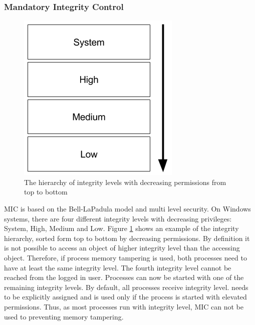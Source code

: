 \subsubsection{Mandatory Integrity Control}
\label{sec:mic}
\begin{figure}[!htbp]
\centering
\includegraphics[scale=0.5]{sections/background/defenses/mic.png}
\caption{The hierarchy of integrity levels with decreasing permissions from top to bottom}
\label{fig:mic}
\end{figure}
\gls{MIC} is based on the Bell-LaPadula \cite{eckert2014sicherheit} model and multi level security. On Windows systems, there are four different integrity levels with decreasing privileges: System, High, Medium and Low. Figure \ref{fig:mic} shows an example of the integrity hierarchy, sorted form top to bottom by decreasing permissions. By definition it is not possible to access an object of higher integrity level than the accessing object. Therefore, if process memory tampering is used, both processes need to have at least the same integrity level. The fourth integrity level  cannot be reached from the logged in user. Processes can now be started with one of the remaining integrity levels. By default, all processes receive  integrity level.  needs to be explicitly assigned and  is used only if the process is started with elevated permissions. Thus, as most processes run with  integrity level, \gls{MIC} can not be used to preventing memory tampering.